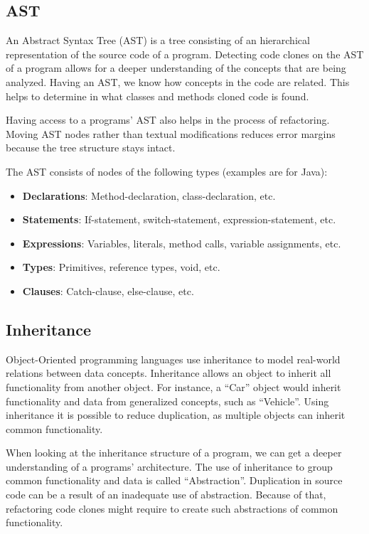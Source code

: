 \subsection{AST} \label{sec:astbackground}
An Abstract Syntax Tree (AST) is a tree consisting of an hierarchical representation of the source code of a program. Detecting code clones on the AST of a program allows for a deeper understanding of the concepts that are being analyzed. Having an AST, we know how concepts in the code are related. This helps to determine in what classes and methods cloned code is found.

Having access to a programs' AST also helps in the process of refactoring. Moving AST nodes rather than textual modifications reduces error margins because the tree structure stays intact.

The AST consists of nodes of the following types (examples are for Java):
\begin{itemize}
  \item \textbf{Declarations}: Method-declaration, class-declaration, etc.
  \item \textbf{Statements}: If-statement, switch-statement, expression-statement, etc.
  \item \textbf{Expressions}: Variables, literals, method calls, variable assignments, etc.
  \item \textbf{Types}: Primitives, reference types, void, etc.
  \item \textbf{Clauses}: Catch-clause, else-clause, etc.
\end{itemize}

\subsection{Inheritance}
Object-Oriented programming languages use inheritance to model real-world relations between data concepts. Inheritance allows an object to inherit all functionality from another object. For instance, a ``Car'' object would inherit functionality and data from generalized concepts, such as ``Vehicle''. Using inheritance it is possible to reduce duplication, as multiple objects can inherit common functionality.

When looking at the inheritance structure of a program, we can get a deeper understanding of a programs' architecture. The use of inheritance to group common functionality and data is called ``Abstraction''. Duplication in source code can be a result of an inadequate use of abstraction. Because of that, refactoring code clones might require to create such abstractions of common functionality.

